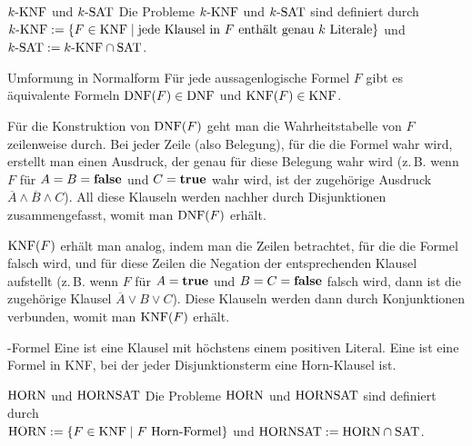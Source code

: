 \begin{Def}{$k\text{-KNF}$ und $k\text{-SAT}$}
    Die Probleme $k\text{-KNF}$ und $k\text{-SAT}$ sind definiert durch\\
    $k\text{-KNF} := \{F \in \text{KNF} \;|\;
    \text{jede Klausel in } F \text{ enthält genau } k \text{ Literale}\}$ und\\
    $k\text{-SAT} := k\text{-KNF} \cap \text{SAT}$.
\end{Def}

\linie

\begin{Satz}{Umformung in Normalform}
    Für jede aussagenlogische Formel $F$ gibt es äquivalente
    Formeln $\text{DNF}(F) \in \text{DNF}$ und $\text{KNF}(F) \in \text{KNF}$.
\end{Satz}

\begin{Beweis}
    Für die Konstruktion von $\text{DNF}(F)$ geht man die Wahrheitstabelle von $F$
    zeilenweise durch.
    Bei jeder Zeile (also Belegung), für die die Formel wahr wird,
    erstellt man einen Ausdruck, der genau für diese Belegung wahr wird
    (z.\,B. wenn $F$ für $A = B = \mathbf{false}$ und $C = \mathbf{true}$ wahr wird,
    ist der zugehörige Ausdruck $\overline{A} \land \overline{B} \land C$).
    All diese Klauseln werden nachher durch Disjunktionen
    zusammengefasst, womit man $\text{DNF}(F)$ erhält.
    
    $\text{KNF}(F)$ erhält man analog, indem man die Zeilen betrachtet, für die die Formel falsch wird,
    und für diese Zeilen die Negation der entsprechenden Klausel aufstellt
    (z.\,B. wenn $F$ für $A = \mathbf{true}$ und $B = C = \mathbf{false}$ falsch wird,
    dann ist die zugehörige Klausel $\overline{A} \lor B \lor C$).
    Diese Klauseln werden dann durch Konjunktionen verbunden, womit man $\text{KNF}(F)$ erhält.
\end{Beweis}

\linie

\begin{Def}{-Formel}
    Eine  ist eine Klausel mit höchstens einem
    positiven Literal.
    Eine  ist eine Formel in KNF, bei der jeder
    Disjunktionsterm eine Horn-Klausel ist.
\end{Def}

\begin{Def}{$\text{HORN}$ und $\text{HORNSAT}$}
    Die Probleme $\text{HORN}$ und $\text{HORNSAT}$ sind definiert durch\\
    $\text{HORN} := \{F \in \text{KNF} \;|\;
    F \text{ Horn-Formel}\}$ und
    $\text{HORNSAT} := \text{HORN} \cap \text{SAT}$.
\end{Def}

